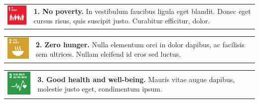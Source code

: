\begin{multicols}{2}
    
    \small
    \setlength\tabcolsep{0pt}
    \renewcommand*{\arraystretch}{1}

    \noindent
    \begin{tabular}{p{25mm} p{46mm}}
        \vspace{0mm} \includegraphics[width=2cm]{text/appendix/appendix-sdg/resources/sdg1.pdf} & \vspace{-0.5mm} \textbf{1. No poverty.} In vestibulum faucibus ligula eget blandit. Donec eget cursus risus, quis suscipit justo. Curabitur efficitur, dolor. \\
    \end{tabular}

    \noindent
    \begin{tabular}{p{25mm} p{46mm}}
        \vspace{0mm} \includegraphics[width=2cm]{text/appendix/appendix-sdg/resources/sdg2.pdf} & \vspace{-0.5mm} \textbf{2. Zero hunger.} Nulla elementum orci in dolor dapibus, ac facilisis sem ultrices. Nullam eleifend id eros sed luctus. \\
    \end{tabular}

    \noindent
    \begin{tabular}{p{25mm} p{46mm}}
        \vspace{0mm} \includegraphics[width=2cm]{text/appendix/appendix-sdg/resources/sdg3.pdf} & \vspace{-0.5mm} \textbf{3. Good health and well-being.} Mauris vitae augue dapibus, molestie justo eget, condimentum ipsum.\\
    \end{tabular}


\end{multicols}
